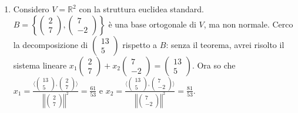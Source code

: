 \documentclass{article}
\begin{document}
\begin{enumerate}
\item Considero $V=%
\mathbb{R}
^{2}$ con la struttura euclidea standard. $B=\left\{ \left( 
\begin{array}{c}
2 \\ 
7%
\end{array}%
\right) ,\left( 
\begin{array}{c}
7 \\ 
-2%
\end{array}%
\right) \right\} $ \`{e} una base ortogonale di $V$, ma non normale. Cerco
la decomposizione di $\left( 
\begin{array}{c}
13 \\ 
5%
\end{array}%
\right) $ rispetto a $B$: senza il teorema, avrei risolto il sistema lineare 
$x_{1}\left( 
\begin{array}{c}
2 \\ 
7%
\end{array}%
\right) +x_{2}\left( 
\begin{array}{c}
7 \\ 
-2%
\end{array}%
\right) =\left( 
\begin{array}{c}
13 \\ 
5%
\end{array}%
\right) $. Ora so che $x_{1}=\frac{\langle \left( 
\begin{array}{c}
13 \\ 
5%
\end{array}%
\right) \mathbf{,}\left( 
\begin{array}{c}
2 \\ 
7%
\end{array}%
\right) \mathbf{\rangle }}{\left\vert \left\vert \left( 
\begin{array}{c}
2 \\ 
7%
\end{array}%
\right) \right\vert \right\vert ^{2}}=\frac{61}{53}$ e $x_{2}=\frac{\langle
\left( 
\begin{array}{c}
13 \\ 
5%
\end{array}%
\right) \mathbf{,}\left( 
\begin{array}{c}
7 \\ 
-2%
\end{array}%
\right) \mathbf{\rangle }}{\left\vert \left\vert \left( 
\begin{array}{c}
7 \\ 
-2%
\end{array}%
\right) \right\vert \right\vert ^{2}}=\frac{81}{53}$.


\end{enumerate}
\end{document}
